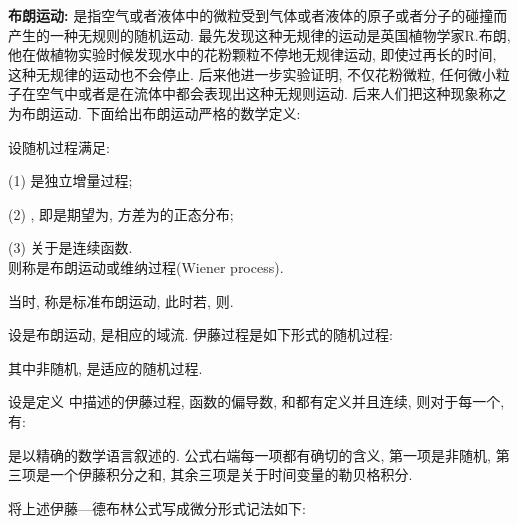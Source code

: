     {\bf 布朗运动:} 是指空气或者液体中的微粒受到气体或者液体的原子或者分子的碰撞而产生的一种无规则的随机运动. 最先发现这种无规律的运动是英国植物学家R.布朗, 他在做植物实验时候发现水中的花粉颗粒不停地无规律运动, 即使过再长的时间, 这种无规律的运动也不会停止. 后来他进一步实验证明, 不仅花粉微粒, 任何微小粒子在空气中或者是在流体中都会表现出这种无规则运动. 后来人们把这种现象称之为布朗运动. 下面给出布朗运动严格的数学定义:
    \begin{defn}
          设随机过程满足:

          (1) 是独立增量过程;

          (2) , 即是期望为, 方差为的正态分布;

          (3)  关于是连续函数.\\
          则称是布朗运动或维纳过程(Wiener process).
    \end{defn}
当时, 称是标准布朗运动, 此时若, 则.
    \begin{defn}[伊藤过程]{\rm{}}\label{yitengdefn}
          设是布朗运动, 是相应的域流. 伊藤过程是如下形式的随机过程:

          其中非随机, 是适应的随机过程.
    \end{defn}
    \begin{lem}[伊藤—德布林公式]{\rm{}}\label{yitformula}
           设是定义 中描述的伊藤过程, 函数的偏导数, 和都有定义并且连续, 则对于每一个, 有:
            \begin{comment}
                f(T,X(T))&=f(0,X(0))+\int_0^Tf_t(t,X(t))dt+\int_0^Tf_x(t,X(t))\Delta(t)dW(t)\\
                &\quad+\int_0^Tf_x(t,X(t))\Theta(t)dt+\frac{1}{2}\int_0^Tf_{xx}(t,X(t))\Delta^2(t)dt.
            \end{comment}
    \end{lem}
    \begin{rem}
         是以精确的数学语言叙述的. 公式右端每一项都有确切的含义, 第一项是非随机, 第三项是一个伊藤积分之和, 其余三项是关于时间变量的勒贝格积分.
    \end{rem}
    将上述伊藤—德布林公式写成微分形式记法如下:
    \begin{comment}
                df(t,X(t))&=f_t(t,X(t))dt+f_x(t,X(t))\Delta(t)dW(t)\\
                &\quad+f_x(t,X(t))\Theta(t)dt+\frac{1}{2}f_{xx}(t,X(t))\Delta^2(t)dt.
    \end{comment}

